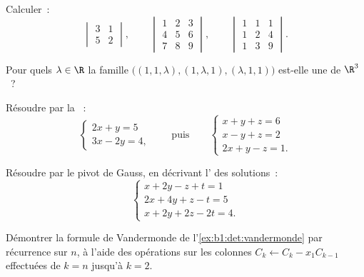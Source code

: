 \begin{exercise}[$\star$]\label{exo:b1:det:1}
Calculer~:
\[
\begin{vmatrix} 3 & 1\\ 5 & 2 \end{vmatrix},
\qquad
\begin{vmatrix} 1 & 2 & 3\\ 4 & 5 & 6\\ 7 & 8 & 9\end{vmatrix},
\qquad
\begin{vmatrix} 1 & 1 & 1\\ 1 & 2 & 4\\ 1 & 3 & 9\end{vmatrix}.
\]
\end{exercise}

\begin{exercise}[$\star$]\label{exo:b1:det:2}
Pour quels $\lambda \in \R$ la famille $\bigl((1, 1, \lambda),
(1, \lambda, 1), (\lambda, 1, 1)\bigr)$ est-elle une  de $\R^3$~?
\end{exercise}

\begin{exercise}[$\star$]\label{exo:b1:det:3}
Résoudre par la ~:
\[
\begin{cases}
2x + y = 5\\
3x - 2y = 4 ,
\end{cases}
\qquad\text{puis}\qquad
\begin{cases}
x + y + z = 6\\
x - y + z = 2\\
2x + y - z = 1 .
\end{cases}
\]
\end{exercise}

\begin{exercise}[$\star$]\label{exo:b1:det:4}
Résoudre par le pivot de Gauss, en décrivant l' des
solutions~:
\[
\begin{cases}
x + 2y - z + t = 1\\
2x + 4y + z - t = 5\\
x + 2y + 2z - 2t = 4 .
\end{cases}
\]
\end{exercise}

\begin{exercise}[$\star\star$]\label{exo:b1:det:5}
Démontrer la formule de Vandermonde de l'\cref{ex:b1:det:vandermonde}
par récurrence sur $n$, à l'aide des opérations sur les colonnes
$C_k \leftarrow C_k - x_1 C_{k-1}$ effectuées de $k = n$ jusqu'à
$k = 2$.
\end{exercise}

